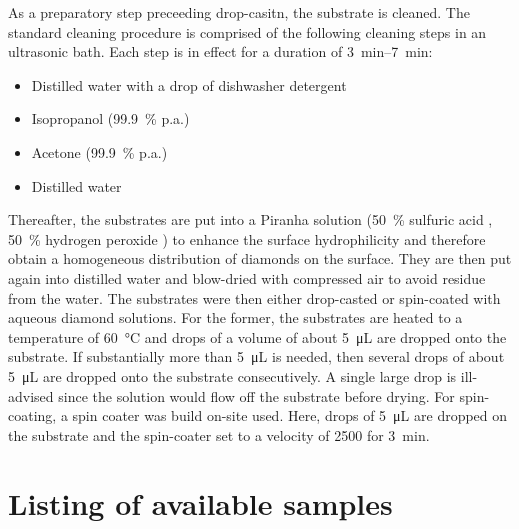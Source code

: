 	As a preparatory step preceeding drop-casitn, the \ir substrate is cleaned.
	The standard cleaning procedure is comprised of the following cleaning steps in an ultrasonic bath. Each step is in effect for  a duration of \SIrange{3}{7}{\minute}:

	\begin{itemize}
		\item Distilled water with a drop of dishwasher detergent
		\item Isopropanol (\SI{99.9}{\percent} p.a.)
		\item Acetone (\SI{99.9}{\percent} p.a.)
		\item Distilled water
	\end{itemize}

	Thereafter, the substrates are put into a Piranha solution (\SI{50}{\percent} sulfuric acid , \SI{50}{\percent} hydrogen peroxide ) to enhance the surface hydrophilicity and therefore obtain a homogeneous distribution of diamonds on the surface.
	They are then put again into distilled water and blow-dried with compressed air to avoid residue from the water.
	The substrates were then either drop-casted or spin-coated with aqueous diamond solutions.
	For the former, the substrates are heated to a temperature of \SI{60}{\celsius} and drops of a volume of about \SI{5}{\micro\liter} are dropped onto the substrate.
	If substantially more than \SI{5}{\micro\liter} is needed, then several drops of about \SI{5}{\micro\liter} are dropped onto the substrate consecutively. A single large drop is ill-advised since the solution would flow off the substrate before drying.
	For spin-coating, a spin coater was build on-site used.
	Here, drops of \SI{5}{\micro\liter} are dropped on the substrate and the spin-coater set to a velocity of \SI{2500}{\rpm} for \SI{3}{\minute}.

 \section{Listing of available samples}

